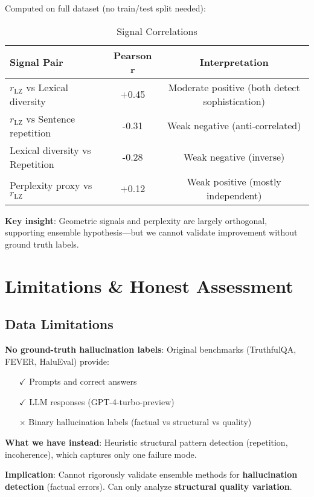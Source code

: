 \documentclass[11pt]{article}
\begin{document}
Computed on full dataset (no train/test split needed):

\begin{table}[h]
\centering
\caption{Signal Correlations}
\label{tab:correlations}
\begin{tabular}{lcc}
\toprule
\textbf{Signal Pair} & \textbf{Pearson r} & \textbf{Interpretation} \\
\midrule
$r_{\text{LZ}}$ vs Lexical diversity & +0.45 & Moderate positive (both detect sophistication) \\
$r_{\text{LZ}}$ vs Sentence repetition & -0.31 & Weak negative (anti-correlated) \\
Lexical diversity vs Repetition & -0.28 & Weak negative (inverse) \\
Perplexity proxy vs $r_{\text{LZ}}$ & +0.12 & Weak positive (mostly independent) \\
\bottomrule
\end{tabular}
\end{table}

\textbf{Key insight}: Geometric signals and perplexity are largely orthogonal, supporting ensemble hypothesis---but we cannot validate improvement without ground truth labels.

\section{Limitations \& Honest Assessment}
\label{sec:limitations}

\subsection{Data Limitations}

\textbf{No ground-truth hallucination labels}: Original benchmarks (TruthfulQA, FEVER, HaluEval) provide:
\begin{itemize}
\item[$\checkmark$] Prompts and correct answers
\item[$\checkmark$] LLM responses (GPT-4-turbo-preview)
\item[$\times$] Binary hallucination labels (factual vs structural vs quality)
\end{itemize}

\textbf{What we have instead}: Heuristic structural pattern detection (repetition, incoherence), which captures only one failure mode.

\textbf{Implication}: Cannot rigorously validate ensemble methods for \textbf{hallucination detection} (factual errors). Can only analyze \textbf{structural quality variation}.
\end{document}
